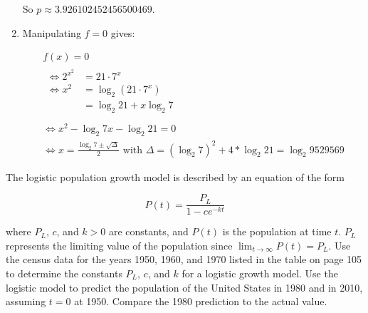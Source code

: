 \documentclass[../../../../Assignments]{subfiles}
\begin{document}
\begin{solution}
\begin{enumerate}[label = \alph*)]
            So \(p \approx \num{3.926102452456500469}\).

        \item Manipulating \(f = 0\) gives:

            \begin{gather*}
                f(x) = 0 \\
                \begin{aligned}
                    \iff 2^{x^2} &= 21 \cdot 7^x \\
                    \iff     x^2 &= \log_{2}(21 \cdot 7^x) \\
                                 &= \log_{2}{21} + x \log_{2}{7} \\
                \end{aligned}\\
                \iff x^2 - \log_{2}{7} x - \log_{2}{21} = 0 \\
                \iff x = \frac{\log_{2}{7} \pm \sqrt{\Delta}}{2} \text{ with } \Delta = (\log_{2} 7)^2 + 4 * \log_{2} 21 = \log_{2} \num{9529569}
            \end{gather*}
    \end{enumerate}
\end{solution}

\begin{exercise}\label{exer:2.3.31}
    The logistic population growth model is described by an equation of the form

    \[P(t) = \frac{P_L}{1 - ce^{-kt}}\]

    \noindent where \(P_L\), \(c\), and \(k > 0\) are constants, and \(P(t)\) is
    the population at time \(t\). \(P_L\) represents the limiting value of the
    population since \(\lim_{t \to \infty} P(t) = P_L\). Use the census data for
    the years 1950, 1960, and 1970 listed in the table on page 105 to determine
    the constants \(P_L\), \(c\), and \(k\) for a logistic growth model. Use the
    logistic model to predict the population of the United States in 1980 and in
    2010, assuming \(t = 0\) at 1950. Compare the 1980 prediction to the actual
    value.
\end{exercise}
\end{document}
